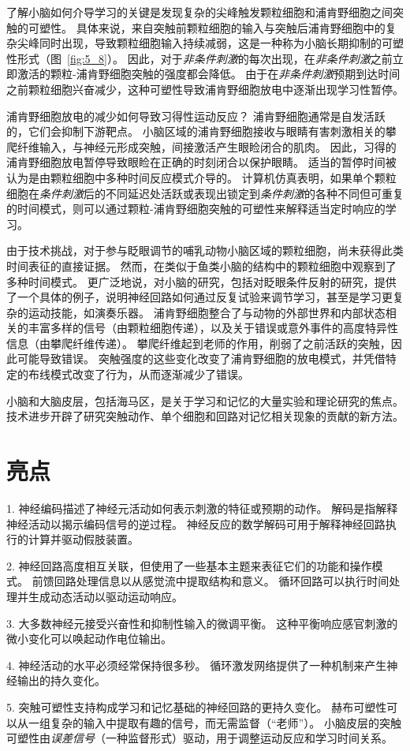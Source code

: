 了解小脑如何介导学习的关键是发现复杂的尖峰触发颗粒细胞和浦肯野细胞之间突触的可塑性。
具体来说，来自突触前颗粒细胞的输入与突触后浦肯野细胞中的复杂尖峰同时出现，导致颗粒细胞输入持续减弱，这是一种称为小脑长期抑制的可塑性形式（图~\ref{fig:5_8}）。
因此，对于\textit{非条件刺激}的每次出现，在\textit{非条件刺激}之前立即激活的颗粒-浦肯野细胞突触的强度都会降低。
由于在\textit{非条件刺激}预期到达时间之前颗粒细胞兴奋减少，这种可塑性导致浦肯野细胞放电中逐渐出现学习性暂停。


浦肯野细胞放电的减少如何导致习得性运动反应？
浦肯野细胞通常是自发活跃的，它们会抑制下游靶点。 
小脑区域的浦肯野细胞接收与眼睛有害刺激相关的攀爬纤维输入，与神经元形成突触，间接激活产生眼睑闭合的肌肉。
因此，习得的浦肯野细胞放电暂停导致眼睑在正确的时刻闭合以保护眼睛。
适当的暂停时间被认为是由颗粒细胞中多种时间反应模式介导的。
计算机仿真表明，如果单个颗粒细胞在\textit{条件刺激}后的不同延迟处活跃或表现出锁定到\textit{条件刺激}的各种不同但可重复的时间模式，则可以通过颗粒-浦肯野细胞突触的可塑性来解释适当定时响应的学习。


由于技术挑战，对于参与眨眼调节的哺乳动物小脑区域的颗粒细胞，尚未获得此类时间表征的直接证据。
然而，在类似于鱼类小脑的结构中的颗粒细胞中观察到了多种时间模式。
更广泛地说，对小脑的研究，包括对眨眼条件反射的研究，提供了一个具体的例子，说明神经回路如何通过反复试验来调节学习，甚至是学习更复杂的运动技能，如演奏乐器。
浦肯野细胞整合了与动物的外部世界和内部状态相关的丰富多样的信号（由颗粒细胞传递），以及关于错误或意外事件的高度特异性信息（由攀爬纤维传递）。
攀爬纤维起到老师的作用，削弱了之前活跃的突触，因此可能导致错误。
突触强度的这些变化改变了浦肯野细胞的放电模式，并凭借特定的布线模式改变了行为，从而逐渐减少了错误。


小脑和大脑皮层，包括海马区，是关于学习和记忆的大量实验和理论研究的焦点。 
技术进步开辟了研究突触动作、单个细胞和回路对记忆相关现象的贡献的新方法。



\section{亮点}

1. 神经编码描述了神经元活动如何表示刺激的特征或预期的动作。
解码是指解释神经活动以揭示编码信号的逆过程。
神经反应的数学解码可用于解释神经回路执行的计算并驱动假肢装置。 


2. 神经回路高度相互关联，但使用了一些基本主题来表征它们的功能和操作模式。 
前馈回路处理信息以从感觉流中提取结构和意义。 
循环回路可以执行时间处理并生成动态活动以驱动运动响应。


3. 大多数神经元接受兴奋性和抑制性输入的微调平衡。 
这种平衡响应感官刺激的微小变化可以唤起动作电位输出。


4. 神经活动的水平必须经常保持很多秒。 
循环激发网络提供了一种机制来产生神经输出的持久变化。


5. 突触可塑性支持构成学习和记忆基础的神经回路的更持久变化。
赫布可塑性可以从一组复杂的输入中提取有趣的信号，而无需监督（“老师”）。
小脑皮层的突触可塑性由\textit{误差信号}（一种监督形式）驱动，用于调整运动反应和学习时间关系。




